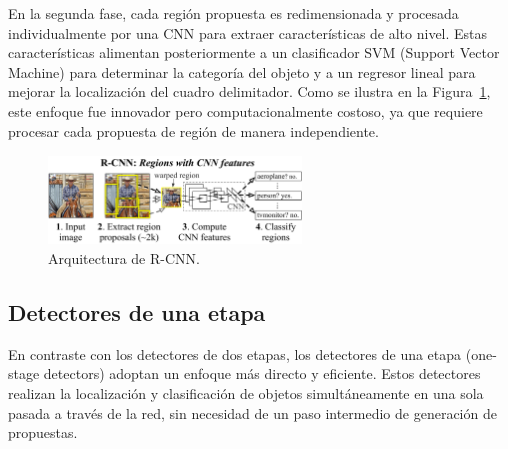 \documentclass[11pt,spanish,listoffigures,listoftables]{tfgetsinf}
\begin{document}
En la segunda fase, cada región propuesta es redimensionada y procesada individualmente por una CNN para extraer características de alto nivel. Estas características alimentan posteriormente a un clasificador SVM (Support Vector Machine) para determinar la categoría del objeto y a un regresor lineal para mejorar la localización del cuadro delimitador. Como se ilustra en la Figura~\ref{fig:r-cnn}, este enfoque fue innovador pero computacionalmente costoso, ya que requiere procesar cada propuesta de región de manera independiente.

\begin{figure}[H]
   \centering
   \includegraphics[width=0.6\textwidth]{images/estado_del_arte/R-CNN.png}
   \caption{Arquitectura de R-CNN.}
   \label{fig:r-cnn}
\end{figure}

\subsection{Detectores de una etapa}

En contraste con los detectores de dos etapas, los detectores de una etapa (one-stage detectors) adoptan un enfoque más directo y eficiente. Estos detectores realizan la localización y clasificación de objetos simultáneamente en una sola pasada a través de la red, sin necesidad de un paso intermedio de generación de propuestas.
\end{document}
